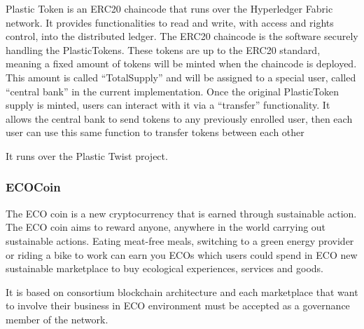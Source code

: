 Plastic Token is an ERC20 chaincode that runs over the Hyperledger Fabric network\cite{plastic-coin}. It provides functionalities to read
and write, with access and rights control, into the distributed ledger. The ERC20 chaincode is the software 
securely handling the PlasticTokens. These tokens are up to the ERC20 standard, meaning a fixed 
amount of tokens will be minted when the chaincode is deployed. This amount is called “TotalSupply” and 
will be assigned to a special user, called “central bank” in the current implementation.
Once the original PlasticToken\cite{ptwist} supply is minted, users can interact with it via a “transfer” functionality. It
allows the central bank to send tokens to any previously enrolled user, then each user can use this same
function to transfer tokens between each other

It runs over the Plastic Twist project. 

\subsubsection{ECOCoin}

The ECO coin\cite{eco-coin} is a new cryptocurrency that is earned through sustainable action. The ECO coin
aims to reward anyone, anywhere in the world carrying out sustainable actions. Eating meat-free
meals, switching to a green energy provider or riding a bike to work can earn you ECOs which
users could spend in ECO new sustainable marketplace to buy ecological experiences, services and
goods. 

It is based on consortium blockchain architecture and each marketplace that want to involve their 
business in ECO environment must be accepted as a governance member of the network. 